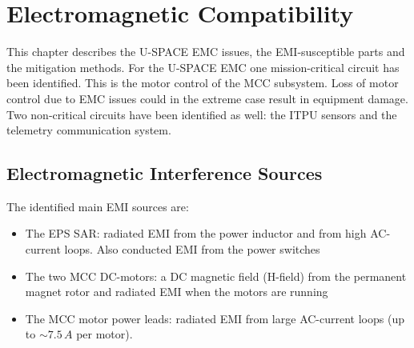 \chapter{Electromagnetic Compatibility}
\label{chap:emc}
%
This chapter describes the \ac{U-SPACE} \ac{EMC} issues, the \ac{EMI}-susceptible parts and the mitigation methods. For the \ac{U-SPACE} \ac{EMC} one mission-critical circuit has been identified. This is the motor control of the \ac{MCC} subsystem. Loss of motor control due to \ac{EMC} issues could in the extreme case result in equipment damage. Two non-critical circuits have been identified as well: the \ac{ITPU} sensors and the telemetry communication system. 
%
\section{Electromagnetic Interference Sources}

The identified main \ac{EMI} sources are:
%
\begin{itemize}
\item The \ac{EPS} \ac{SAR}: radiated \ac{EMI} from the power inductor and from high AC-current loops. Also conducted \ac{EMI} from the power switches
\item The two \ac{MCC} DC-motors: a DC magnetic field (H-field) from the permanent magnet rotor and radiated \ac{EMI} when the motors are running
\item The \ac{MCC} motor power leads: radiated \ac{EMI} from large AC-current loops (up to $\sim 7.5\,A$ per motor).
\end{itemize}
%
